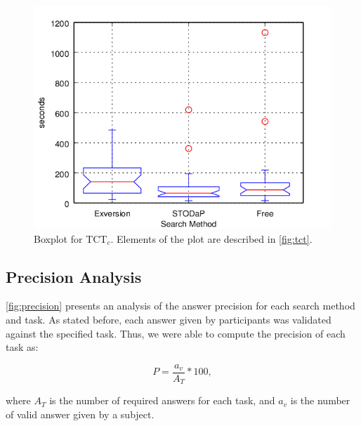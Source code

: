 \begin{figure}[h]
\begin{center}
\includegraphics[scale=1.2]{images/tct_boxplotresults_correct.png}
\caption[Boxplot for TCT$_{c}$.]{Boxplot for TCT$_{c}$. Elements of the plot are described in \autoref{fig:tct}.}
\label{fig:tct_c}
\end{center}
\end{figure}



\subsection{Precision Analysis}

\autoref{fig:precision} presents an analysis of the answer precision for each search method and task.
As stated before, each answer given by participants was validated against the specified task.
Thus, we were able to compute the precision of each task as:

\begin{equation}
	P = \frac{a_v}{A_T} * 100,
\end{equation}

where $A_T$ is the number of required answers for each task, and $a_v$ is the number of valid answer given by a subject.

